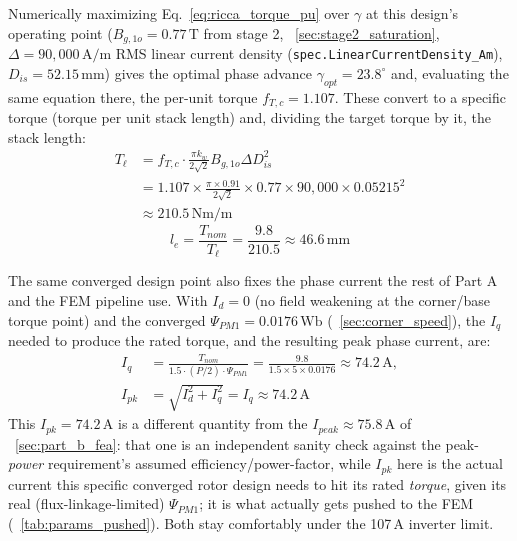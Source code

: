\documentclass[10pt,final,journal,a4paper,oneside,twocolumn]{IEEEtran}
\begin{document}
Numerically maximizing Eq.~\ref{eq:ricca_torque_pu} over $\gamma$ at this design's operating point ($B_{g,1o}=0.77\,\text{T}$ from stage 2, \sectionname~\ref{sec:stage2_saturation}, $\Delta=90{,}000\,\text{A/m}$ RMS linear current density (\texttt{spec.LinearCurrentDensity\_Am}), $D_{is}=52.15\,\text{mm}$) gives the optimal phase advance $\gamma_{opt}=23.8^\circ$ and, evaluating the same equation there, the per-unit torque $f_{T,c}=1.107$. These convert to a specific torque (torque per unit stack length) and, dividing the target torque by it, the stack length:
\begin{equation}
    \label{eq:specific_torque}
    \begin{split}
    T_\ell &= f_{T,c}\cdot\frac{\pi k_w}{2\sqrt2}B_{g,1o}\Delta D_{is}^2 \\
    &= 1.107\times\frac{\pi\times0.91}{2\sqrt2}\times0.77\times90{,}000\times0.05215^2 \\
    &\approx 210.5\,\text{Nm/m}
    \end{split}
\end{equation}
\begin{equation}
    \label{eq:stack_length}
    l_e = \frac{T_{nom}}{T_\ell} = \frac{9.8}{210.5} \approx 46.6\,\text{mm}
\end{equation}

The same converged design point also fixes the phase current the rest of Part A and the FEM pipeline use. With $I_d=0$ (no field weakening at the corner/base torque point) and the converged $\Psi_{PM1}=0.0176\,\text{Wb}$ (\sectionname~\ref{sec:corner_speed}), the $I_q$ needed to produce the rated torque, and the resulting peak phase current, are:
\begin{equation}
    \label{eq:iq_current}
    \begin{aligned}
    I_q &= \frac{T_{nom}}{1.5\cdot(P/2)\cdot\Psi_{PM1}} = \frac{9.8}{1.5\times5\times0.0176} \approx 74.2\,\text{A}, \\
    I_{pk} &= \sqrt{I_d^2+I_q^2}=I_q\approx74.2\,\text{A}
    \end{aligned}
\end{equation}
This $I_{pk}=74.2\,\text{A}$ is a different quantity from the $I_{peak}\approx75.8\,\text{A}$ of \sectionname~\ref{sec:part_b_fea}: that one is an independent sanity check against the peak-\emph{power} requirement's assumed efficiency/power-factor, while $I_{pk}$ here is the actual current this specific converged rotor design needs to hit its rated \emph{torque}, given its real (flux-linkage-limited) $\Psi_{PM1}$; it is what actually gets pushed to the FEM (\tablename~\ref{tab:params_pushed}). Both stay comfortably under the 107\,A inverter limit.
\end{document}
